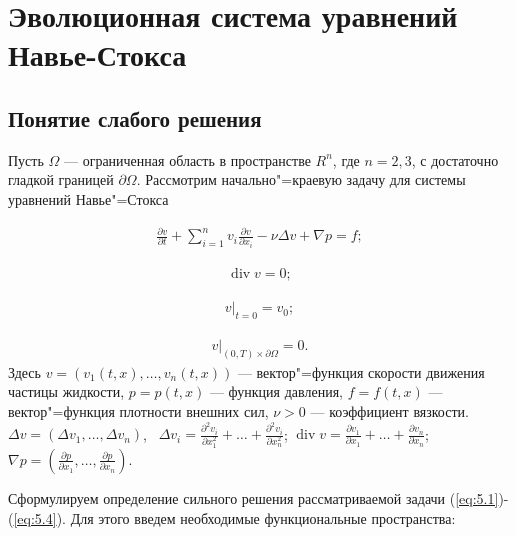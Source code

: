 \section{Эволюционная система уравнений \\Навье-Стокса}
\subsection {Понятие слабого решения}
Пусть $\Omega$ --- ограниченная область в пространстве $R^n$, где $n=2, 3$, с достаточно гладкой границей $\partial\Omega$.
Рассмотрим начально"=краевую задачу для системы уравнений Навье"=Стокса

\begin{equation}\label{eq:5.1}
    \begin{gathered}
        \frac{\partial v}{\partial t}+\sum_{i=1}^nv_i\frac{\partial v}{\partial x_i}-\nu\Delta v+\nabla p=f;
    \end{gathered}
\end{equation}

\begin{equation}\label{eq:5.2}
    \begin{gathered}
        \operatorname{div} v=0;
    \end{gathered}
\end{equation}

\begin{equation}\label{eq:5.3}
    \begin{gathered}
        v|_{t=0}=v_0;
    \end{gathered}
\end{equation}

\begin{equation}\label{eq:5.4}
    \begin{gathered}
        v|_{(0, T)\times\partial\Omega}=0.
    \end{gathered}
\end{equation}
Здесь $v=(v_1(t, x),\ldots,v_n(t, x))$ --- вектор"=функция скорости движения частицы жидкости, $p=p(t, x)$ --- функция давления,
$f=f(t, x)$ --- вектор"=функция плотности внешних сил, $\nu>0$ --- коэффициент вязкости.
$\Delta v=(\Delta v_1,\ldots,\Delta v_n)$, \ $\Delta v_i= \frac{\partial^2 v_i}{\partial x_1^2}+\ldots+\frac{\partial^2 v_i}{\partial x_n^2}$;
$\operatorname{div} v= \frac{\partial v_1}{\partial x_1}+\ldots+\frac{\partial v_n}{\partial x_n}$;
$\nabla p=(\frac{\partial p}{\partial x_1},\ldots,\frac{\partial p}{\partial x_n})$.

Сформулируем определение сильного решения рассматриваемой задачи (\ref{eq:5.1})-(\ref{eq:5.4}).
Для этого введем необходимые функциональные пространства:

